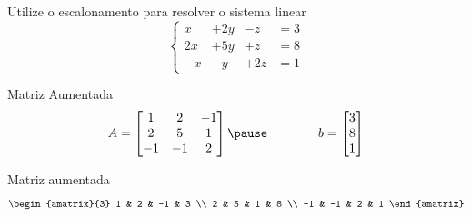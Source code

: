 \begin{question}
  Utilize o escalonamento para resolver o sistema linear
  \[
    \left\{\begin{array}{rrrr}
      x  & + 2y & -  z & = 3 \\
      2x & + 5y & +  z & = 8 \\
      -x & - y  & + 2z & = 1
    \end{array}\right.
  \]
\end{question}

\begin{resolution}{Matriz Aumentada}
  \[
    A =
    \begin{bmatrix}
      1  & 2  & -1  \\
      2  & 5  & 1   \\
      -1 & -1 & 2
    \end{bmatrix}
    \pause
    \qquad\qquad
    b =
    \begin{bmatrix}
       3 \\
       8 \\
       1
    \end{bmatrix}
  \]

  \pause
  Matriz aumentada
  \[
    \begin{amatrix}{3}
      1  & 2  & -1 & 3 \\
      2  & 5  & 1  & 8 \\
      -1 & -1 & 2  & 1
    \end{amatrix}
  \]
\end{resolution}

